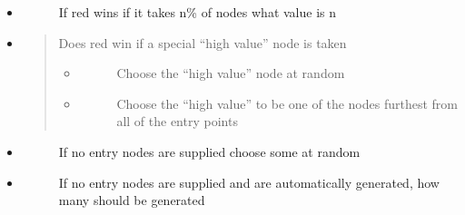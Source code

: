\documentclass[letterpaper,10pt,english]{sphinxmanual}
\begin{document}
\begin{itemize}
\item {} \begin{description}
\item[{}] \leavevmode
\sphinxAtStartPar
If red wins if it takes n\% of nodes what value is n

\end{description}

\item {}
\sphinxAtStartPar
{}
\begin{quote}

\sphinxAtStartPar
Does red win if a special “high value” node is taken
\begin{itemize}
\item {} \begin{description}
\item[{}] \leavevmode
\sphinxAtStartPar
Choose the “high value” node at random

\end{description}

\item {} \begin{description}
\item[{}] \leavevmode
\sphinxAtStartPar
Choose the “high value” to be one of the nodes furthest from all of the entry points

\end{description}

\end{itemize}
\end{quote}

\item {} \begin{description}
\item[{}] \leavevmode
\sphinxAtStartPar
If no entry nodes are supplied choose some at random

\end{description}

\item {} \begin{description}
\item[{}] \leavevmode
\sphinxAtStartPar
If no entry nodes are supplied and are automatically generated, how many should be generated


\end{description}
\end{itemize}
\end{document}
